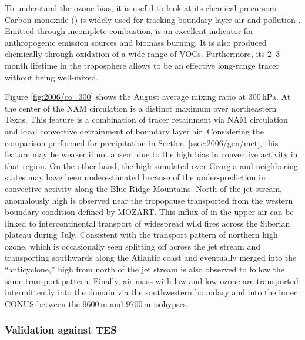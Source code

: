 To understand the ozone bias, it is useful to look at its chemical precursors. Carbon monoxide () is widely used for
tracking boundary layer air and pollution \citep[e.g.][]{Pan:2007sw,Weinstock:2007yj,Mcmillan:2010kx}. Emitted through incomplete
combustion,  is an excellent indicator for anthropogenic emission sources and biomass burning. It is also produced chemically through  oxidation
of a wide range of VOCs. Furthermore, its 2--3 month lifetime in the troposphere allows  to be an effective long-range tracer without being well-mixed.

Figure \ref{fig:2006/co_300} shows the August average  mixing ratio at 300\,\unit{hPa}. At the center of the NAM circulation is a distinct 
maximum over northeastern Texas. This feature is a combination of tracer retainment via NAM circulation and local convective detrainment of boundary layer
air. Considering the comparison performed for precipitation in Section~\ref{ssec:2006/gen/met}, this feature may be weaker if not absent due to the high bias in
convective activity in that region. On the other hand, the high  simulated over Georgia and neighboring states may have been underestimated because
of the under-prediction in convective activity along the Blue Ridge Mountains. North of the jet stream, anomalously high  is observed near the
tropopause transported from the western boundary condition defined by MOZART. This influx of  in the upper air can be linked to intercontinental transport
of widespread wild fires across the Siberian plateau during July.
Consistent with the transport pattern of northern high ozone, which is occasionally seen splitting off across the jet stream and transporting southwards along the
Atlantic coast and eventually merged into the ``anticyclone,'' high  from north of the jet stream is also observed to follow the same transport pattern.
Finally, air mass with low  and low ozone are transported intermittently into the domain via the southwestern boundary and into the inner CONUS
between the 9600\,\unit{m} and 9700\,\unit{m} isohypses.

\subsubsection{Validation against TES}

